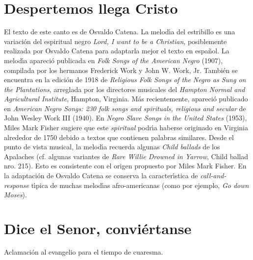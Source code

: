 \documentclass[landscape,12pt]{report}
\begin{document}
\section*{\small Despertemos llega Cristo} \noindent\footnotesize El texto de este canto es de Osvaldo Catena. La melod\'\i a del estribillo es una variaci\'on del espiritual negro \emph{Lord, I want to be a Christian}, posiblemente realizada por Osvaldo Catena para adaptarla mejor el texto en espa\~nol. La melod\'\i a apareci\'o publicada en \emph{Folk Songs of the American Negro} (1907), compilada por los hermanos Frederick Work y John W. Work, Jr. Tambi\'en se encuentra en la edici\'on de 1918 de \emph{Religious Folk Songs of the Negro as Sung on the Plantations}, arreglada por los directores musicales del \emph{Hampton Normal and Agricultural Institute}, Hampton, Virginia. M\'as recientemente, apareci\'o publicado en \emph{American Negro Songs: 230 folk songs and spirituals, religious and secular} de John Wesley Work III (1940).  En \emph{Negro Slave Songs in the United States} (1953), Miles Mark Fisher sugiere que este \emph{spiritual} podr\'\i a haberse originado en Virginia alrededor de 1750 debido a 
textos que contienen palabras similares. Desde el punto de vista musical, la melod\'\i a recuerda algunas \emph{Child ballads} de los Apalaches (cf. algunas variantes de \emph{Rare Willie Drowned in Yarrow}, Child ballad nro. 215). Esto es consistente con el origen propuesto por Miles Mark Fisher. En la adaptaci\'on de Osvaldo Catena se conserva la caracter\'\i stica de \emph{call-and-response} t\'\i pica de muchas melod\'\i as afro-americanas (como por ejemplo, \emph{Go down Moses}). 
\section*{\small Dice el Senor, convi\'ertanse} \noindent\footnotesize Aclamaci\'on al evangelio para el tiempo de cuaresma. 
\end{document}
